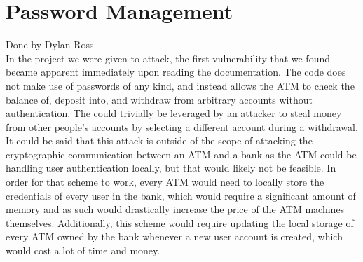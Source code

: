 \section{Password Management}\label{sec:passwords}
Done by Dylan Ross\\

	\medskip
	In the project we were given to attack, the first vulnerability that we found became apparent immediately upon reading the documentation. The code does not make use of passwords of any
	kind, and instead allows the ATM to check the balance of, deposit into, and withdraw from arbitrary accounts without authentication. The could trivially be leveraged by an attacker
	to steal money from other people's accounts by selecting a different account during a withdrawal.\\

	It could be said that this attack is outside of the scope of attacking the cryptographic communication between an ATM and a bank as the ATM could be handling user authentication locally, but
	that would likely not be feasible. In order for that scheme to work, every ATM would need to locally store the credentials of every user in the bank, which would require a significant amount
	of memory and as such would drastically increase the price of the ATM machines themselves. Additionally, this scheme would require updating the local storage of every ATM owned by the bank
	whenever a new user account is created, which would cost a lot of time and money.
